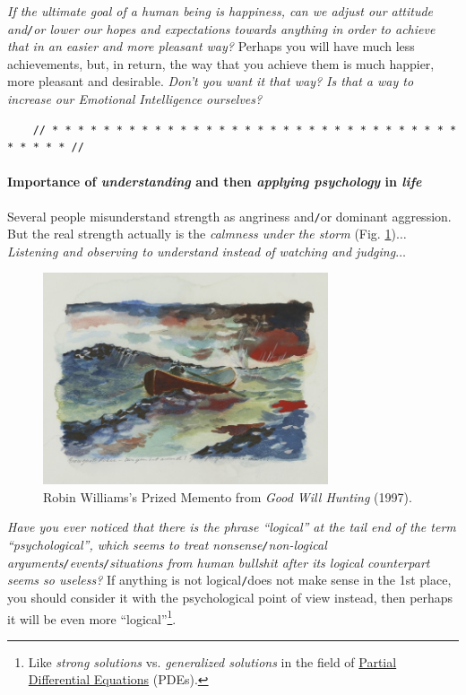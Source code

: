 \documentclass[12pt]{article}
\begin{document}
{\it If the ultimate goal of a human being is happiness, can we adjust our attitude and{\tt/}or lower our hopes and expectations towards anything in order to achieve that in an easier and more pleasant way?} Perhaps you will have much less achievements, but, in return, the way that you achieve them is much happier, more pleasant and desirable. {\it Don't you want it that way? Is that a way to increase our Emotional Intelligence ourselves?}

\begin{verbatim}
	// * * * * * * * * * * * * * * * * * * * * * * * * * * * * * * * * * * * * * //
\end{verbatim}

\paragraph{Importance of {\it understanding} and then {\it applying psychology} in {\it life}}

\noindent{} Several people misunderstand strength as angriness and{\tt/}or dominant aggression. But the real strength actually is the {\it calmness under the storm} (Fig. \ref{fig6})$\ldots$ {\it Listening and observing to understand instead of watching and judging}$\ldots$

\begin{figure}[h]
	\centering
	\includegraphics[width=0.75\textwidth]{boat_under_storm}
	\caption{Robin Williams's Prized Memento from {\it Good Will Hunting} (1997).}
	\label{fig6}
\end{figure}
{\it Have you ever noticed that there is the phrase ``logical'' at the tail end of the term ``psychological'', which seems to treat nonsense{\tt/}non-logical arguments{\tt/}events{\tt/}situations from human bullshit after its logical counterpart seems so useless?} If anything is not logical{\tt/}does not make sense in the 1st place, you should consider it with the psychological point of view instead, then perhaps it will be even more ``logical''\footnote{Like {\it strong solutions} vs. {\it generalized solutions} in the field of \href{https://en.wikipedia.org/wiki/Partial_differential_equation}{Partial Differential Equations} (PDEs).}.
\end{document}
